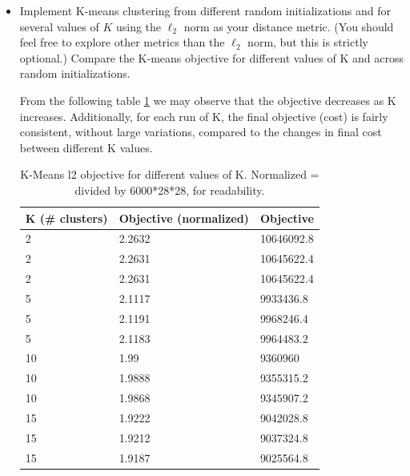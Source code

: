 \documentclass[submit]{harvardml}
\newenvironment{answer}{%
\color{answergreen}\sffamily\large}{}
\begin{document}
\begin{itemize}
\item Implement K-means clustering
from different random initializations 
and for several values of $K$ using the 
$\ell_2$ norm as your
distance metric. (You should feel free to explore other metrics 
than the $\ell_2$ norm, but this is strictly optional.)  Compare the 
K-means objective for different values of K and across random
initializations.
%
\begin{answer}

    From the following table \ref{my-label} we may observe that the objective decreases as K increases.
    Additionally, for each run of K, the final objective (cost) is fairly consistent, without large
    variations, compared to the changes in final cost between different K values.

    \begin{table}[H]
        \centering
        \caption{K-Means l2 objective for different values of K. Normalized = divided by 6000*28*28,
        for readability.}
        \label{my-label}
        \begin{tabular}{@{}lll@{}}
            \toprule
            K (\# clusters) & Objective (normalized) & Objective  \\ \midrule
            2               & 2.2632                 & 10646092.8 \\
            2               & 2.2631                 & 10645622.4 \\
            2               & 2.2631                 & 10645622.4 \\
            5               & 2.1117                 & 9933436.8  \\
            5               & 2.1191                 & 9968246.4  \\
            5               & 2.1183                 & 9964483.2  \\
            10              & 1.99                   & 9360960    \\
            10              & 1.9888                 & 9355315.2  \\
            10              & 1.9868                 & 9345907.2  \\
            15              & 1.9222                 & 9042028.8  \\
            15              & 1.9212                 & 9037324.8  \\
            15              & 1.9187                 & 9025564.8  \\ \bottomrule
        \end{tabular}
    \end{table}


\end{answer}
\end{itemize}
\end{document}
